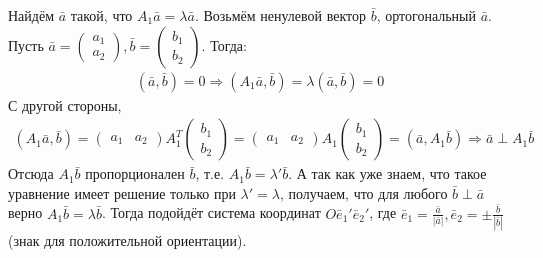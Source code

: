 \documentclass[a4paper, 12pt]{article}
\theoremstyle{definition}
\begin{document}
\begin{enumerate}
		Найдём $\bar{a}$ такой, что $A_1 \bar{a} = \lambda \bar{a}$. Возьмём ненулевой вектор $\bar{b}$, ортогональный $\bar{a}$. Пусть $\bar{a} = \begin{pmatrix} a_1 \\ a_2 \end{pmatrix}, \bar{b} = \begin{pmatrix} b_1 \\ b_2 \end{pmatrix}$. Тогда: \begin{align*}
		(\bar{a}, \bar{b}) = 0 \Rightarrow (A_1 \bar{a}, \bar{b}) = \lambda(\bar{a}, \bar{b}) = 0
		\end{align*}
		С другой стороны, \begin{align*}
			(A_1 \bar{a}, \bar{b}) = \begin{pmatrix} a_1 & a_2 \end{pmatrix}A_1^T \begin{pmatrix} b_1 \\ b_2 \end{pmatrix} = \begin{pmatrix} a_1 & a_2 \end{pmatrix}A_1 \begin{pmatrix} b_1 \\ b_2 \end{pmatrix} = (\bar{a}, A_1 \bar{b})\Rightarrow \bar{a} \perp A_1 \bar{b} 
		\end{align*} 
		Отсюда $A_1 \bar{b}$ пропорционален $\bar{b}$, т.е. $A_1 \bar{b} = \lambda' \bar{b}$. А так как уже знаем, что такое уравнение имеет решение только при $\lambda' = \lambda$, получаем, что для любого $\bar{b} \perp \bar{a}$ верно $A_1 \bar{b} = \lambda\bar{b}$. Тогда подойдёт система координат $O\bar{e}_1'\bar{e}_2'$, где $\bar{e}_{1} = \frac{\bar{a}}{|\bar{a}|}, \bar{e}_{2} = \pm\frac{\bar{b}}{|\bar{b}|}$ (знак для положительной ориентации).
	\end{enumerate}
\end{document}
